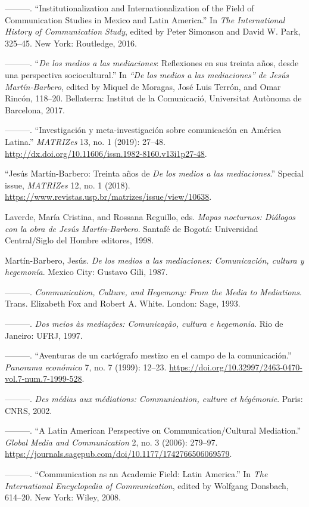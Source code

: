 \documentclass{tufte-handout}
\begin{document}
\begin{hangparas}{.25in}{1}
---------. ``Institutionalization and Internationalization of the Field
of Communication Studies in Mexico and Latin America.'' In \emph{The
International History of Communication Study}, edited by Peter Simonson
and David W. Park, 325--45. New York: Routledge, 2016.

---------. ``\emph{De los medios a las mediaciones}: Reflexiones en sus
treinta años, desde una perspectiva sociocultural.'' In \emph{``De los
medios a las mediaciones'' de Jesús Martín-Barbero}, edited by Miquel de
Moragas, José Luis Terrón, and Omar Rincón, 118--20. Bellaterra:
Institut de la Comunicació, Universitat Autònoma de Barcelona, 2017.

---------. ``Investigación y meta-investigación sobre comunicación en
América Latina.'' \emph{MATRIZes} 13, no. 1 (2019): 27--48.
\url{http://dx.doi.org/10.11606/issn.1982-8160.v13i1p27-48}.

``Jesús Martín-Barbero: Treinta años de \emph{De los medios a las
mediaciones}.'' Special issue, \emph{MATRIZes} 12, no. 1 (2018).
\url{https://www.revistas.usp.br/matrizes/issue/view/10638}.

Laverde, María Cristina, and Rossana Reguillo, eds. \emph{Mapas
nocturnos: Diálogos con la obra de Jesús Martín-Barbero}. Santafé de
Bogotá: Universidad Central/Siglo del Hombre editores, 1998.

Martín-Barbero, Jesús. \emph{De los medios a las mediaciones:
Comunicación, cultura y hegemonía}. Mexico City: Gustavo Gili, 1987.

---------. \emph{Communication, Culture, and Hegemony: From the Media to
Mediations}. Trans. Elizabeth Fox and Robert A. White. London: Sage,
1993.

---------. \emph{Dos meios às mediações: Comunicação, cultura e
hegemonia}. Rio de Janeiro: UFRJ, 1997.

---------. ``Aventuras de un cartógrafo mestizo en el campo de la
comunicación.'' \emph{Panorama económico} 7, no. 7 (1999): 12--23.
\url{https://doi.org/10.32997/2463-0470-vol.7-num.7-1999-528}.

---------. \emph{Des médias aux médiations: Communication, culture et
hégémonie}. Paris: CNRS, 2002.

---------. ``A Latin American Perspective on Communication/Cultural
Mediation.'' \emph{Global Media and Communication} 2, no. 3 (2006):
279--97.
\url{https://journals.sagepub.com/doi/10.1177/1742766506069579}.

---------. ``Communication as an Academic Field: Latin America.'' In
\emph{The International Encyclopedia of Communication}, edited by
Wolfgang Donsbach, 614--20. New York: Wiley, 2008.


\end{hangparas}
\end{document}

